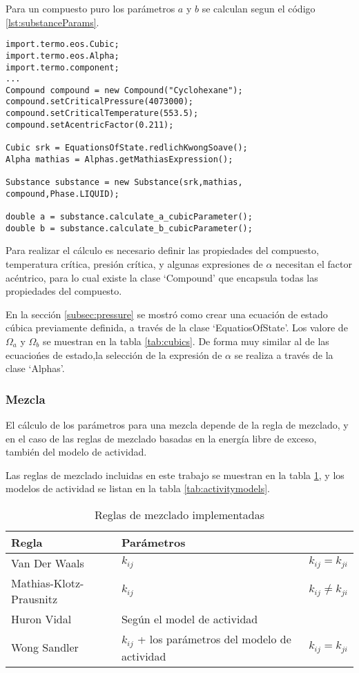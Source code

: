 Para un compuesto puro los parámetros $a$ y $b$ se calculan segun el código \ref{lst:substanceParams}.


\begin{lstlisting}[caption={Cálculo de los parámetros para el Ciclohexano, con la ecuación de estado Soave Redlich Kwong y la expresión de $\alpha$ de mathias },label={lst:substanceParams}]
import.termo.eos.Cubic;
import.termo.eos.Alpha;
import.termo.component;
...
Compound compound = new Compound("Cyclohexane");
compound.setCriticalPressure(4073000);
compound.setCriticalTemperature(553.5);
compound.setAcentricFactor(0.211);

Cubic srk = EquationsOfState.redlichKwongSoave();
Alpha mathias = Alphas.getMathiasExpression();

Substance substance = new Substance(srk,mathias, compound,Phase.LIQUID);

double a = substance.calculate_a_cubicParameter();
double b = substance.calculate_b_cubicParameter();
\end{lstlisting}


Para realizar el cálculo es necesario definir las propiedades del compuesto, temperatura crítica, presión crítica, y algunas expresiones de $\alpha$ necesitan el factor acéntrico, para lo cual existe la clase `Compound' que encapsula todas las propiedades del compuesto.


En la sección \ref{subsec:pressure} se mostró como crear una ecuación de estado cúbica previamente definida, a través de la clase `EquatiosOfState'. Los valore de $\Omega_a$ y $\Omega_b$ se muestran en la tabla \ref{tab:cubics}. De forma muy similar al de las ecuaciońes de estado,la selección de la expresión de $\alpha$ se realiza a través de la clase `Alphas'.




\subsubsection{Mezcla}

El cálculo de los parámetros para una mezcla depende de la regla de mezclado, y en el caso de las reglas de mezclado basadas en la energía libre de exceso, también del modelo de actividad.

Las reglas de mezclado incluidas en este trabajo se muestran en la tabla \ref{tab:mixingrules}, y los modelos de actividad se listan en la tabla \ref{tab:activitymodels}.


\begin{table}
\begin{tabularx}{\textwidth}{|X|X|X|}
	\hline
	Regla & Parámetros & \\
	\hline
	Van Der Waals & $k_{ij}$ & $k_{ij} = k_{ji}$ \\
	Mathias-Klotz-Prausnitz& $k_{ij}$ & $k_{ij} \neq k_{ji}$ \\
	Huron Vidal & Según el model de actividad & \\
	Wong Sandler & $k_{ij}$ + los parámetros del modelo de actividad & $k_{ij} = k_{ji}$ \\
	\hline
\end{tabularx}
\caption{Reglas de mezclado implementadas}\label{tab:mixingrules}
\end{table}

